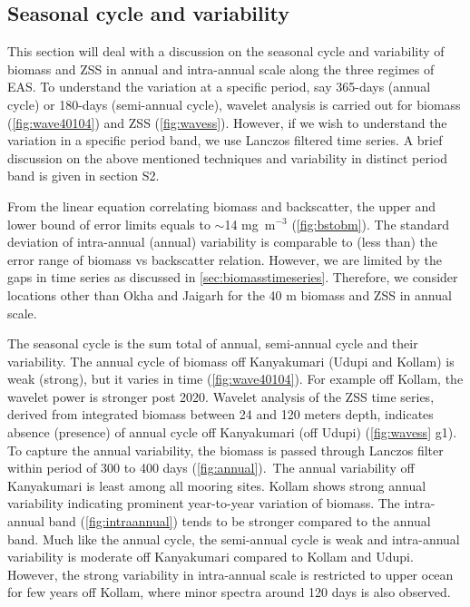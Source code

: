\documentclass{article}
\begin{document}
	\subsection{Seasonal cycle and variability}
	\label{sec:seasonalcyclezss}
	This section will deal with a discussion on the seasonal cycle and variability of biomass and ZSS in annual and intra-annual scale along the three regimes of EAS. To understand the variation at a specific period, say 365-days (annual cycle) or 180-days (semi-annual cycle), wavelet analysis is carried out for biomass (\cref{fig:wave40104}) and ZSS (\cref{fig:wavess}). However, if we wish to understand the variation in a specific period band, we use Lanczos filtered time series. A brief discussion on the above mentioned techniques and variability in distinct period band is given in section S2. 
	
	From the linear equation correlating biomass and backscatter, the upper and lower bound of error limits equals to $\sim$14 mg~m$^{-3}$ (\cref{fig:bstobm}). The standard deviation of intra-annual (annual) variability is comparable to (less than) the error range of biomass vs backscatter relation. However, we are limited by the gaps in time series as discussed in \cref{sec:biomasstimeseries}. Therefore, we consider locations other than Okha and Jaigarh for the 40 m biomass and ZSS in annual scale. 
	
	The seasonal cycle is the sum total of annual, semi-annual cycle and their variability. The annual cycle of biomass off Kanyakumari (Udupi and Kollam) is weak (strong), but it varies in time (\cref{fig:wave40104}). For example off Kollam, the wavelet power is stronger post 2020. Wavelet analysis of the ZSS time series, derived from integrated biomass between 24 and 120 meters depth, indicates absence (presence) of annual cycle off Kanyakumari (off Udupi) (\cref{fig:wavess} g1). To capture the annual variability, the biomass is passed through Lanczos filter within period of 300 to 400 days (\cref{fig:annual}).~The annual variability off Kanyakumari is least among all mooring sites. Kollam shows strong annual variability indicating prominent year-to-year variation of biomass. The intra-annual band (\cref{fig:intraannual}) tends to be stronger compared to the annual band. Much like the annual cycle, the semi-annual cycle is weak and intra-annual variability is moderate off Kanyakumari compared to Kollam and Udupi. However, the strong variability in intra-annual scale is restricted to upper ocean for few years off Kollam, where minor spectra around 120 days is also observed.
	
\end{document}
